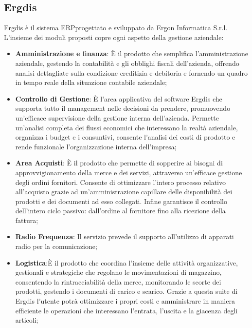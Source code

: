 \pagebreak
\subsection{Ergdis}

Ergdis è il sistema ERP\glosp progettato e sviluppato da Ergon Informatica S.r.l. \newline
L'insieme dei moduli proposti copre ogni aspetto della gestione aziendale:

\begin{itemize}
	\item \textbf{Amministrazione e finanza}: È il prodotto che semplifica l’amministrazione aziendale, gestendo la contabilità e gli obblighi fiscali dell’azienda, offrendo analisi dettagliate sulla condizione creditizia e debitoria e fornendo un quadro in tempo reale della situazione contabile aziendale;
	
	\item \textbf{Controllo di Gestione}: È l’area applicativa del software Ergdis che supporta tutto il management nelle decisioni da prendere, promuovendo un’efficace supervisione della gestione interna dell’azienda. Permette un’analisi completa dei flussi economici che interessano la realtà aziendale, organizza i budget e i consuntivi, consente l’analisi dei costi di prodotto e rende funzionale l’organizzazione interna dell’impresa;
	
	\item \textbf{Area Acquisti}: È il prodotto che permette di sopperire ai bisogni di approvvigionamento della merce e dei servizi, attraverso un’efficace gestione degli ordini fornitori. Consente di ottimizzare l'intero processo relativo all’acquisto grazie ad un’amministrazione capillare delle disponibilità dei prodotti e dei documenti ad esso collegati. Infine garantisce il controllo dell’intero ciclo passivo: dall’ordine al fornitore fino alla ricezione della fattura;
	
	\item \textbf{Radio Frequenza}: Il servizio prevede il supporto all'utilizzo di apparati radio per la comunicazione;
	
	\item \textbf{Logistica}:È il prodotto che coordina l’insieme delle attività organizzative, gestionali e strategiche che regolano le movimentazioni di magazzino, consentendo la rintracciabilità della merce, monitorando le scorte dei prodotti, gestendo i documenti di carico e scarico. Grazie a questa suite di Ergdis l’utente potrà ottimizzare i propri costi e amministrare in maniera efficiente le operazioni che interessano l’entrata, l’uscita e la giacenza degli articoli;
	

\end{itemize}
